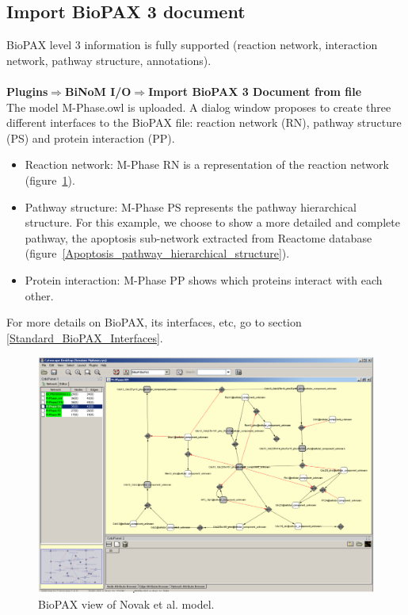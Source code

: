 \subsection{Import BioPAX 3 document}
BioPAX level 3 information is fully supported (reaction network, interaction network, pathway structure, annotations).\\\\
\textbf{Plugins$\Rightarrow$BiNoM  I/O$\Rightarrow$Import BioPAX 3 Document from file}\\
The model M-Phase.owl\cite{novak1998model} is uploaded. A dialog window proposes to create three different interfaces to the BioPAX file: reaction network (RN), pathway structure (PS) and protein interaction (PP).
\begin{itemize}
\item Reaction network: M-Phase RN is a representation of the reaction network (figure~\ref{View_BioPAX_of_Novak}).
\item Pathway structure: M-Phase PS represents the pathway hierarchical structure. For this example, we choose to show a more detailed and complete pathway, the apoptosis sub-network extracted from Reactome database (figure~\ref{Apoptosis_pathway_hierarchical_structure}).
\item Protein interaction: M-Phase PP shows which proteins interact with each other.
\end{itemize}
For more details on BioPAX, its interfaces, etc, go to section \ref{Standard_BioPAX_Interfaces}.
\begin{figure}
\centering
\includegraphics[width=18 cm]{graphics/View_BioPAX_of_Novak}
\caption{BioPAX view of Novak et al. model.}
\label{View_BioPAX_of_Novak}
\end{figure}

